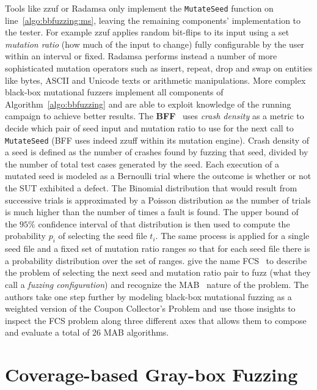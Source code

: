 Tools like zzuf or Radamsa only implement the \texttt{MutateSeed} function on
line~\ref{algo:bbfuzzing:ms}, leaving the remaining components' implementation
to the tester. For example zzuf applies random bit-flips to its input using a
set \emph{mutation ratio} (how much of the input to change) fully configurable
by the user within an interval or fixed. Radamsa performs instead a number of
more sophisticated mutation operators such as insert, repeat, drop and swap on
entities like bytes, ASCII and Unicode texts or arithmetic manipulations. More
complex black-box mutational fuzzers implement all components of
Algorithm~\ref{algo:bbfuzzing} and are able to exploit knowledge of the running
campaign to achieve better results.
The \textbf{\acf{BFF}}~\cite{householder2012probability} uses \emph{crash
density} as a metric to decide which pair of seed input and mutation ratio to
use for the next call to \texttt{MutateSeed} (\ac{BFF} uses indeed zzuff within
its mutation engine). Crash density of a seed is defined as the number of
crashes found by fuzzing that seed, divided by the number of total test cases
generated by the seed. Each execution of a mutated seed is modeled as a
Bernoulli trial where the outcome is whether or not the \ac{SUT} exhibited a
defect. The Binomial distribution that would result from successive trials is
approximated by a Poisson distribution as the number of trials is much higher
than the number of times a fault is found. The upper bound of the $95\%$
confidence interval of that distribution is then used to compute the probability
$p_i$ of selecting the seed file $t_i$. The same process is applied for a single
seed file and a fixed set of mutation ratio ranges so that for each seed file
there is a probability distribution over the set of ranges.
\citeauthor{woo2013scheduling} give the name \ac{FCS}~\cite{woo2013scheduling}
to describe the problem of selecting the next seed and mutation ratio pair to
fuzz (what they call a \emph{fuzzing configuration}) and recognize the
\ac{MAB}~\cite{berry1985bandit} nature of the problem. The authors take one step
further by modeling black-box mutational fuzzing as a weighted version of the
Coupon Collector's Problem and use those insights to inspect the \ac{FCS}
problem along three different axes that allows them to compose and evaluate a
total of 26 \ac{MAB} algorithms.

\section{Coverage-based Gray-box Fuzzing}
\label{sec:cgf}

